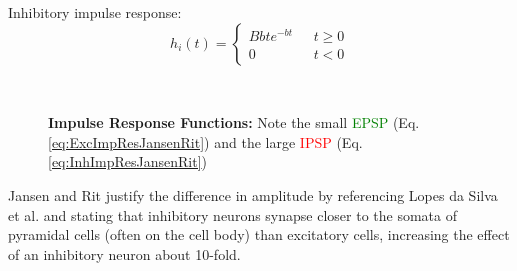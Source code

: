 Inhibitory impulse response:
\begin{equation}
    h_i(t) = \begin{cases}
                 Bbte^{-bt} & \mbox{ } t \geq 0 \\
                 0 & \mbox{ } t < 0
    \end{cases} \label{eq:InhImpResJansenRit}
\end{equation}



\begin{figure}[H]
    \centering
    \pgfplotsset{compat = newest}

    \caption{\textbf{Impulse Response Functions:} Note the small \textcolor{green}{EPSP}  (Eq. \ref{eq:ExcImpResJansenRit}) and the large \textcolor{red}{IPSP}  (Eq. \ref{eq:InhImpResJansenRit}) \parencite{jansen_neurophysiologically-based_1993}} \
    \label{fig:PSPPlot}
\end{figure}

Jansen and Rit \cite{jansen_neurophysiologically-based_1993} justify the difference in amplitude by referencing Lopes da Silva et al. \cite{lopes_da_silva_models_1976} and stating that inhibitory neurons synapse closer to the somata of pyramidal cells (often on the cell body) than excitatory cells, increasing the effect of an inhibitory neuron about 10-fold.

